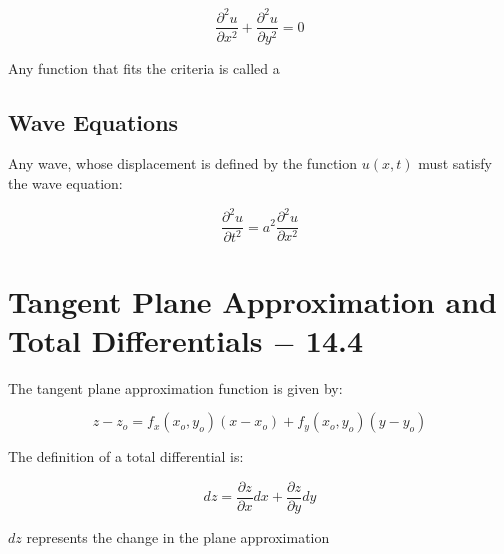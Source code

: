\documentclass[12pt]{article}
\begin{document}
$$\frac{\partial^2u}{\partial x^2} + \frac{\partial^2u}{\partial y^2}=0$$

Any function that fits the criteria is called a 

\subsection{Wave Equations}

Any wave, whose displacement is defined by the function $u(x,t)$ must satisfy the wave equation:

$$\frac{\partial^2u}{\partial t^2}=a^2\frac{\partial^2u}{\partial x^2}$$

\section{Tangent Plane Approximation and Total Differentials $-$ 14.4}

The tangent plane approximation function is given by:

$$z-z_o=f_x(x_o,y_o)(x-x_o)+f_y(x_o,y_o)(y-y_o)$$

The definition of a total differential is:

$$dz = \frac{\partial z}{\partial x}dx + \frac{\partial z}{\partial y}dy$$

$dz$ represents the change in the plane approximation
\end{document}
